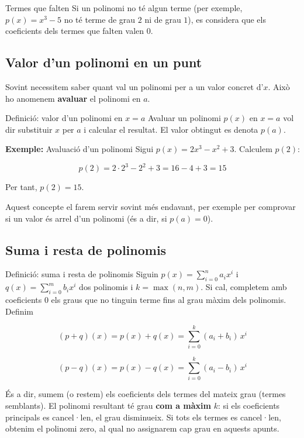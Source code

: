 \begin{nota}{Termes que falten}
Si un polinomi no té algun terme (per exemple, $p(x)=x^3-5$ no té terme de grau $2$ ni de grau $1$), es considera que els coeficients dels termes que falten valen $0$.
\end{nota}

\subsection{Valor d'un polinomi en un punt}

Sovint necessitem saber quant val un polinomi per a un valor concret d'$x$. Això ho anomenem \textbf{avaluar} el polinomi en $a$.

\begin{definicio}{Definició: valor d'un polinomi en $x=a$}
Avaluar un polinomi $p(x)$ en $x=a$ vol dir substituir $x$ per $a$ i calcular el resultat. El valor obtingut es denota $p(a)$.
\end{definicio}

\begin{exemple}{\textbf{Exemple:} Avaluació d'un polinomi}
Sigui $p(x) = 2x^3-x^2+3$. Calculem $p(2)$:

\[
p(2) = 2\cdot 2^3 - 2^2 + 3 = 16-4+3 = 15
\]

Per tant, $p(2)=15$.
\end{exemple}

Aquest concepte el farem servir sovint més endavant, per exemple per comprovar si un valor és arrel d'un polinomi (és a dir, si $p(a)=0$).

\subsection{Suma i resta de polinomis}

\begin{definicio}{Definició: suma i resta de polinomis}
Siguin $p(x)=\displaystyle\sum_{i=0}^n a_i x^i$ i $q(x)=\displaystyle\sum_{i=0}^m b_i x^i$ dos polinomis i $k=\max(n,m)$. Si cal, completem amb coeficients $0$ els graus que no tinguin terme fins al grau màxim dels polinomis. Definim

\[
(p+q)(x) = p(x)+q(x) = \sum_{i=0}^k (a_i+b_i)\,x^i
\]

\[
(p-q)(x) = p(x)-q(x) = \sum_{i=0}^k (a_i-b_i)\,x^i
\]

És a dir, sumem (o restem) els coeficients dels termes del mateix grau (termes semblants). El polinomi resultant té grau \textbf{com a màxim} $k$: si els coeficients principals es cancel·len, el grau disminueix. Si tots els termes es cancel·len, obtenim el polinomi zero, al qual no assignarem cap grau en aquests apunts.
\end{definicio}

